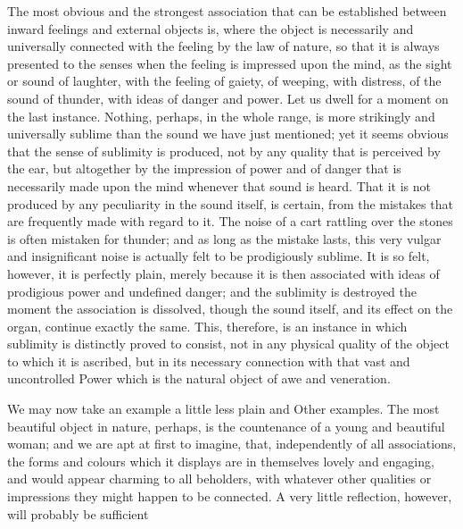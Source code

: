 \documentclass{article}
\begin{document}
The most obvious and the strongest association that can be established between inward feelings and external objects is, where the object is necessarily and universally connected with the feeling by the law of nature, so that it is always presented to the senses when the feeling is impressed upon the mind, as the sight or sound of laughter, with the feeling of gaiety, of weeping, with distress, of the sound of thunder, with ideas of danger and power. Let us dwell for a moment on the last instance. Nothing, perhaps, in the whole range, is more strikingly and universally sublime than the sound we have just mentioned; yet it seems obvious that the sense of sublimity is produced, not by any quality that is perceived by the ear, but altogether by the impression of power and of danger that is necessarily made upon the mind whenever that sound is heard. That it is not produced by any peculiarity in the sound itself, is certain, from the mistakes that are frequently made with regard to it. The noise of a cart rattling over the stones is often mistaken for thunder; and as long as the mistake lasts, this very vulgar and insignificant noise is actually felt to be prodigiously sublime. It is so felt, however, it is perfectly plain, merely because it is then associated with ideas of prodigious power and undefined danger; and the sublimity is destroyed the moment the association is dissolved, though the sound itself, and its effect on the organ, continue exactly the same. This, therefore, is an instance in which sublimity is distinctly proved to consist, not in any physical quality of the object to which it is ascribed, but in its necessary connection with that vast and uncontrolled Power which is the natural object of awe and veneration.

We may now take an example a little less plain and Other examples. The most beautiful object in nature, perhaps, is the countenance of a young and beautiful woman; and we are apt at first to imagine, that, independently of all associations, the forms and colours which it displays are in themselves lovely and engaging, and would appear charming to all beholders, with whatever other qualities or impressions they might happen to be connected. A very little reflection, however, will probably be sufficient
\end{document}

